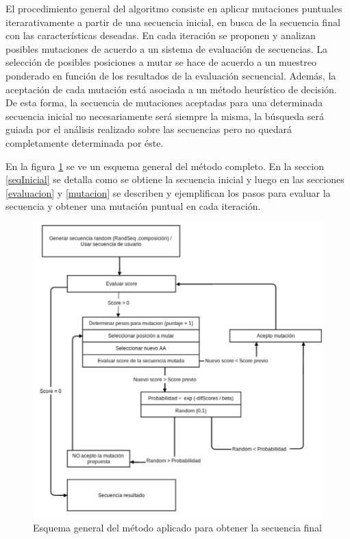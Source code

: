 El procedimiento general del algoritmo consiste en aplicar mutaciones puntuales iterarativamente a partir de una secuencia inicial, en busca de la secuencia final con las características deseadas.
En cada iteración se proponen y analizan posibles mutaciones de acuerdo a un sistema de evaluación de secuencias.
La selección de posibles posiciones a mutar se hace de acuerdo a un muestreo ponderado en función de los resultados de la evaluación secuencial.
Además, la aceptación de cada mutación está asociada a un método heurístico de decisión.
De esta forma, la secuencia de mutaciones aceptadas para una determinada secuencia inicial no necesariamente será siempre la misma, 
la búsqueda será guiada por el análisis realizado sobre las secuencias pero no quedará completamente determinada por éste. 

En la figura \ref{fig:esquema-algoritmo} se ve un esquema general del método completo. 
En la seccion \ref{seqInicial} se detalla como se obtiene la secuencia inicial y luego en las secciones \ref{evaluacion} y \ref{mutacion} se describen y ejemplifican los pasos para evaluar la secuencia y obtener una mutación puntual 
en cada iteración.


\begin{figure}[h!]
\centering
   \includegraphics[width=\textwidth]{img/diagrama-algoritmo-2.png}
 \caption{Esquema general del método aplicado para obtener la secuencia final}
 \label{fig:esquema-algoritmo}
\end{figure}



